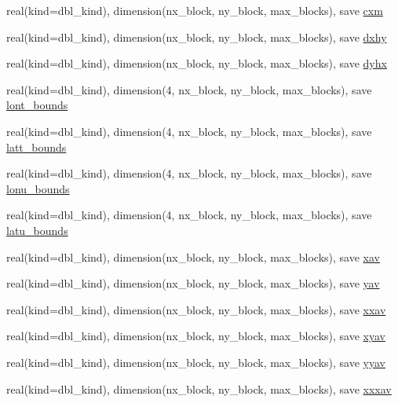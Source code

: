 \begin{DoxyCompactItemize}
real(kind=dbl\_\-kind), dimension(nx\_\-block, ny\_\-block, max\_\-blocks), save \hyperlink{namespaceice__grid_a83a8de6d0e58a6771b3d915acd63afd7}{cxm}
\item 
real(kind=dbl\_\-kind), dimension(nx\_\-block, ny\_\-block, max\_\-blocks), save \hyperlink{namespaceice__grid_a0247c390ce33b9435bbff4edbff8b9e7}{dxhy}
\item 
real(kind=dbl\_\-kind), dimension(nx\_\-block, ny\_\-block, max\_\-blocks), save \hyperlink{namespaceice__grid_ab6ee5703ec9bc808f8ebcf436960d722}{dyhx}
\item 
real(kind=dbl\_\-kind), dimension(4, nx\_\-block, ny\_\-block, max\_\-blocks), save \hyperlink{namespaceice__grid_ae3bd428fa166bb43e833ff27111c5d8e}{lont\_\-bounds}
\item 
real(kind=dbl\_\-kind), dimension(4, nx\_\-block, ny\_\-block, max\_\-blocks), save \hyperlink{namespaceice__grid_ab343eaee175150d30612b98bf5e83faf}{latt\_\-bounds}
\item 
real(kind=dbl\_\-kind), dimension(4, nx\_\-block, ny\_\-block, max\_\-blocks), save \hyperlink{namespaceice__grid_abaf36c701426b67cd588146d434b1f99}{lonu\_\-bounds}
\item 
real(kind=dbl\_\-kind), dimension(4, nx\_\-block, ny\_\-block, max\_\-blocks), save \hyperlink{namespaceice__grid_a03b1e73bc95079d90193478f58f192ce}{latu\_\-bounds}
\item 
real(kind=dbl\_\-kind), dimension(nx\_\-block, ny\_\-block, max\_\-blocks), save \hyperlink{namespaceice__grid_aa84e4b92963d682ab3222a9d5716cbe8}{xav}
\item 
real(kind=dbl\_\-kind), dimension(nx\_\-block, ny\_\-block, max\_\-blocks), save \hyperlink{namespaceice__grid_a637cce7adf54c42ab41eeaf347cf824e}{yav}
\item 
real(kind=dbl\_\-kind), dimension(nx\_\-block, ny\_\-block, max\_\-blocks), save \hyperlink{namespaceice__grid_a7c8bb3b029d335971804fce931af7a4b}{xxav}
\item 
real(kind=dbl\_\-kind), dimension(nx\_\-block, ny\_\-block, max\_\-blocks), save \hyperlink{namespaceice__grid_aa4182840814568ebe32038898cd5a7ad}{xyav}
\item 
real(kind=dbl\_\-kind), dimension(nx\_\-block, ny\_\-block, max\_\-blocks), save \hyperlink{namespaceice__grid_ae982b98ad7bfa759bb9a1da9dd749783}{yyav}
\item 
real(kind=dbl\_\-kind), dimension(nx\_\-block, ny\_\-block, max\_\-blocks), save \hyperlink{namespaceice__grid_a62131a38b595f37c91ebbec351691ef3}{xxxav}
\item 

\end{DoxyCompactItemize}

